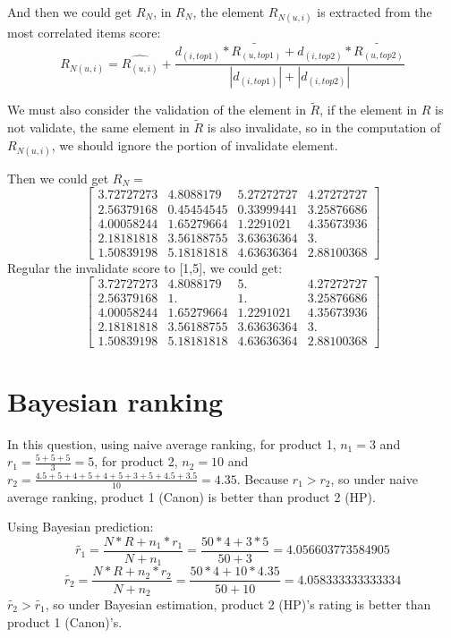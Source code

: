 \documentclass[12pt,a4paper]{article}
\begin{document}
And then we could get $R_N$, in $R_N$, the element $R_{N(u,i)}$ is extracted from the most correlated items score:
\begin{equation}
R_{N(u,i)} = \hat{R_{(u,i)}}+\frac{d_{(i,top1)}*\tilde{R_{(u,top1)}}  +d_{(i,top2)}*\tilde{R_{(u,top2)}}  }{ |d_{(i,top1)}|+|d_{(i,top2)}|}
\end{equation}

We must also consider the validation of the element in $\tilde{R}$, if the element in $R$ is not validate, the same element in $\tilde{R}$ is also invalidate, so in the computation of $R_{N(u,i)}$, we should ignore the portion of invalidate element.

Then we could get $R_N=$
\begin{equation}
\begin{bmatrix}
3.72727273&  4.8088179 &  5.27272727&  4.27272727\\
2.56379168&  0.45454545&  0.33999441&  3.25876686\\
4.00058244&  1.65279664&  1.2291021 &  4.35673936\\
2.18181818&  3.56188755&  3.63636364&  3.        \\
1.50839198&  5.18181818&  4.63636364&  2.88100368
\end{bmatrix}
\end{equation}
Regular the invalidate score to [1,5], we could get:
\begin{equation}
\begin{bmatrix}
3.72727273&  4.8088179 &  5.&  4.27272727\\
2.56379168&  1.& 1.&  3.25876686\\
4.00058244&  1.65279664&  1.2291021 &  4.35673936\\
2.18181818&  3.56188755&  3.63636364&  3.        \\
1.50839198&  5.18181818&  4.63636364&  2.88100368
\end{bmatrix}
\end{equation}
\section{Bayesian ranking}
In this question, using naive average ranking, for product 1, $n_1 = 3$ and $r_1 = \frac{5+5+5}{3} = 5$, for product 2, $n_2 = 10$ and $r_2 = \frac{4.5+5+4+5+4+5+3+5+4.5+3.5}{10} = 4.35$. Because $r_1 > r_2$, so under naive average ranking, product 1 (Canon) is better than product 2 (HP).

Using Bayesian prediction:
\begin{equation}
\tilde{r_1} = \frac{N*R+n_1*r_1}{N+n_1} = \frac{50*4+3*5}{50+3} = 4.056603773584905
\end{equation}
\begin{equation}
\tilde{r_2} = \frac{N*R+n_2*r_2}{N+n_2} = \frac{50*4+10*4.35}{50+10} =4.058333333333334
\end{equation}
$\tilde{r_2}  > \tilde{r_1} $, so under Bayesian estimation, product 2 (HP)'s rating is better than product 1 (Canon)'s.
\end{document}
